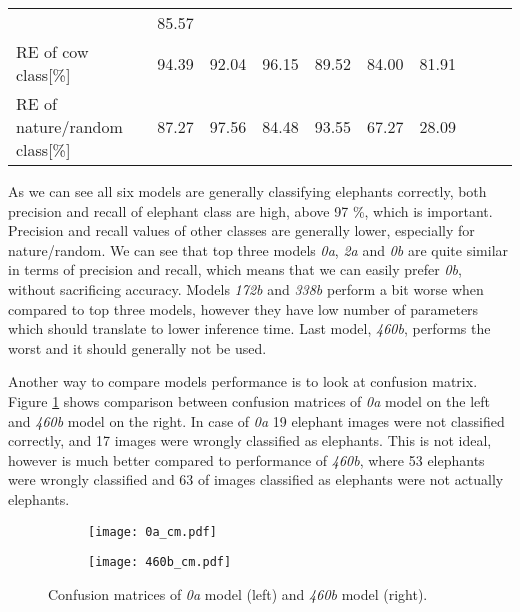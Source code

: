 \begin{table}[ht]
{\begin{tabular}{lrrrrrrrrr}
                                        & \cellcolor{tbred}85.57\\
        RE of cow class[\%]             & \cellcolor{tbgreeny}94.39     
                                        & \cellcolor{tbyellow}92.04   
                                        & \cellcolor{tbgreen}96.15   
                                        & \cellcolor{tbyellow}89.52  
                                        & \cellcolor{tbyellow}84.00  
                                        & \cellcolor{tbred}81.91\\
        RE of nature/random class[\%]   & \cellcolor{tbyellow}87.27     
                                        & \cellcolor{tbgreen}97.56   
                                        & \cellcolor{tbyellow}84.48   
                                        & \cellcolor{tbgreeny}93.55  
                                        & \cellcolor{tbyellow}67.27  
                                        & \cellcolor{tbred}28.09\\\bottomrule
    \end{tabular}}
    \label{precision_recall_table}
\end{table}

As we can see all six models are generally classifying elephants correctly, both precision and recall of elephant class are high, above 97 \%, which is important.
Precision and recall values of other classes are generally lower, especially for nature/random.
We can see that top three models \textit{0a}, \textit{2a} and \textit{0b} are quite similar in terms of precision and recall, which means that we can easily prefer \textit{0b}, without sacrificing accuracy. 
Models \textit{172b} and \textit{338b} perform a bit worse when compared to top three models, however they have low number of parameters which should translate to lower inference time.
Last model, \textit{460b}, performs the worst and it should generally not be used.

Another way to compare models performance is to look at confusion matrix.
Figure \ref{double_cm} shows comparison between confusion matrices of \textit{0a} model on the left and \textit{460b} model on the right.
In case of \textit{0a} 19 elephant images were not classified correctly, and 17 images were wrongly classified as elephants.
This is not ideal, however is much better compared to performance of \textit{460b}, where 53 elephants were wrongly classified and 63 of images classified as elephants were not actually elephants.
\newline
\begin{figure}[ht]
    \begin{subfigure}{0.5\textwidth}
        \centering
        \texttt{[image: 0a\_cm.pdf]} 
    \end{subfigure}
    \begin{subfigure}{0.5\textwidth}
        \centering
        \texttt{[image: 460b\_cm.pdf]}
    \end{subfigure}
    \caption{Confusion matrices of \textit{0a} model (left) and \textit{460b} model (right).}
    \label{double_cm}
\end{figure}
\newpage

